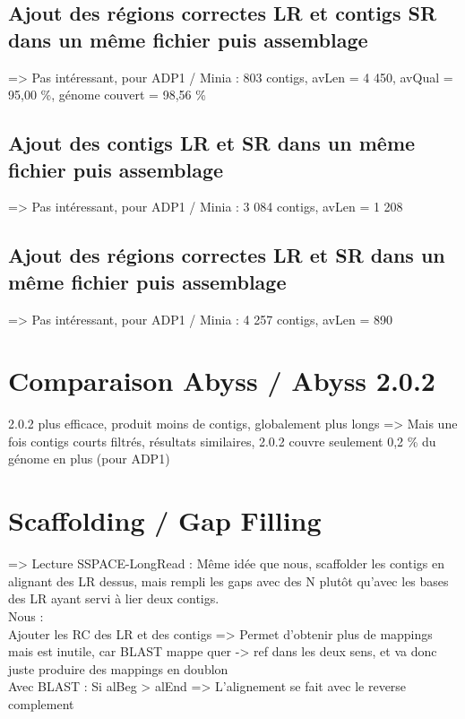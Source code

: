 \documentclass[12pt]{article}
\begin{document}
\subsection{Ajout des régions correctes LR et contigs SR dans un même fichier puis assemblage}

=> Pas intéressant, pour ADP1 / Minia : 803 contigs, avLen  = 4 450, avQual = 95,00 \%, génome couvert = 98,56 \%

\subsection{Ajout des contigs LR et SR dans un même fichier puis assemblage}

=> Pas intéressant, pour ADP1 / Minia : 3 084 contigs, avLen = 1 208

\subsection{Ajout des régions correctes LR et SR dans un même fichier puis assemblage}

=> Pas intéressant, pour ADP1 / Minia : 4 257 contigs, avLen = 890

\section{Comparaison Abyss / Abyss 2.0.2}

2.0.2 plus efficace, produit moins de contigs, globalement plus longs => Mais une fois contigs courts filtrés, résultats similaires, 2.0.2 couvre seulement 0,2 \% du génome en plus (pour ADP1)

\section{Scaffolding / Gap Filling}

=> Lecture SSPACE-LongRead : Même idée que nous, scaffolder les contigs en alignant des LR dessus, mais rempli les gaps avec des N plutôt
qu'avec les bases des LR ayant servi à lier deux contigs. \\

Nous : \\

Ajouter les RC des LR et des contigs => Permet d'obtenir plus de mappings mais est inutile, car BLAST mappe quer -> ref dans les deux sens,
et va donc juste produire des mappings en doublon \\

Avec BLAST : Si alBeg > alEnd => L'alignement se fait avec le reverse complement \\
\end{document}
